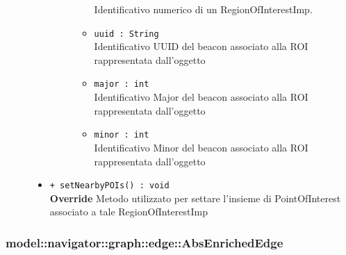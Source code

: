 \documentclass[../DefinizioneDiProdotto.tex]{subfiles}
\begin{document}
\begin{description}
\begin{itemize}
\begin{description}
\begin{itemize}
Identificativo numerico di un RegionOfInterestImp.\item \texttt{uuid : String}\\
Identificativo UUID del beacon associato alla ROI rappresentata dall'oggetto\item \texttt{major : int}\\
Identificativo Major del beacon associato alla ROI rappresentata dall'oggetto\item \texttt{minor : int}\\
Identificativo Minor del beacon associato alla ROI rappresentata dall'oggetto\end{itemize}
\end{description}
\item \texttt{+ setNearbyPOIs() : void}\\
\textbf{Override} Metodo utilizzato per settare l'insieme di PointOfInterest associato a tale RegionOfInterestImp
 \end{itemize}
\end{description}

\subsubsection{model::navigator::graph::edge::AbsEnrichedEdge}
\end{document}
